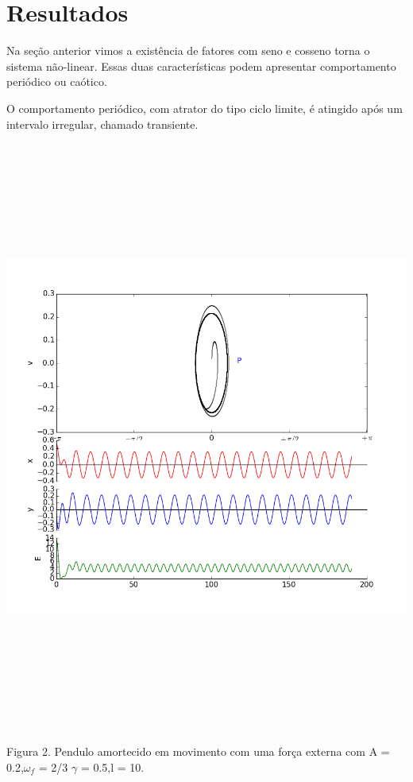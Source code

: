 \documentclass[dvipsnames,a4paper,11pt]{article}
\begin{document}
\section{Resultados}

Na seção anterior vimos a existência de fatores com seno e cosseno torna o sistema não-linear. Essas duas características podem apresentar comportamento periódico ou caótico.

O comportamento periódico, com atrator do tipo ciclo limite, é atingido após um intervalo irregular, chamado transiente.

\begin{center}
	\includegraphics[width=6.24in,height=7.68in,keepaspectratio = false]{image1.png}
	
	\scriptsize Figura 2. Pendulo amortecido em movimento com uma força externa com A = 0.2,$\omega_f$ = 2/3 $\gamma$ = 0.5,l = 10. 
	
\end{center}
\end{document}
